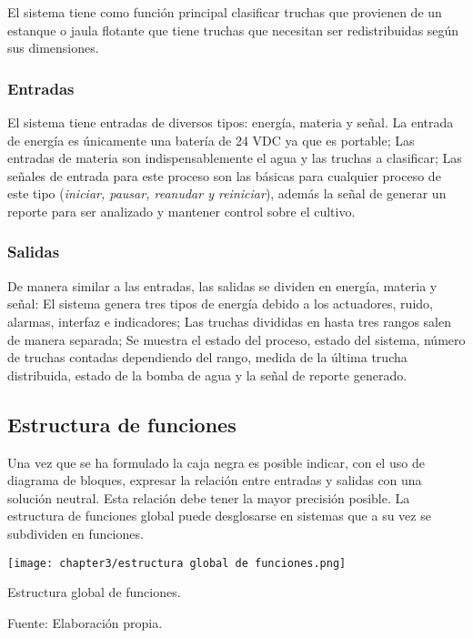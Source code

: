 El sistema tiene como función principal clasificar truchas que provienen de un estanque o jaula flotante que tiene truchas que necesitan ser redistribuidas según sus dimensiones.

\subsubsection{Entradas}

El sistema tiene entradas de diversos tipos: energía, materia y señal. La entrada de energía es únicamente una batería de 24 VDC ya que es portable; Las entradas de materia son indispensablemente el agua y las truchas a clasificar; Las señales de entrada para este proceso son las básicas para cualquier proceso de este tipo (\textit{iniciar, pausar, reanudar y reiniciar}), además la señal de generar un reporte para ser analizado y mantener control sobre el cultivo.

\subsubsection{Salidas}

De manera similar a las entradas, las salidas se dividen en energía, materia y señal: El sistema genera tres tipos de energía debido a los actuadores, ruido, alarmas, interfaz e indicadores; Las truchas divididas en hasta tres rangos salen de manera separada; Se muestra el estado del proceso, estado del sistema, número de truchas contadas dependiendo del rango, medida de la última trucha distribuida, estado de la bomba de agua y la señal de reporte generado.

\subsection{Estructura de funciones}

Una vez que se ha formulado la caja negra es posible indicar, con el uso de diagrama de bloques, expresar la relación entre entradas y salidas con una solución neutral. Esta relación debe tener la mayor precisión posible. La estructura de funciones global puede desglosarse en sistemas que a su vez se subdividen en funciones.\cite[p.~169-181]{Pahl2007}

\newpage
\thispagestyle{mylandscape}
\begin{landscape}
	\begin{myfigure}[H]
		\footnotesize\centering
		\texttt{[image: chapter3/estructura global de funciones.png]}
		\caption{Estructura global de funciones.}
		\begin{myflushcenter}			
			Fuente: Elaboración propia.
		\end{myflushcenter}
		\label{fig:estructura global de funciones}
	\end{myfigure}
\end{landscape}


